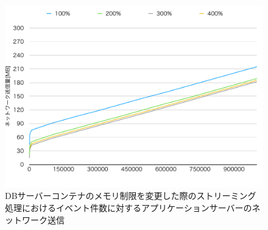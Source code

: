 \documentclass[../../../../../main]{subfiles}
\begin{document}
    \begin{figure}[H]
        \centering
        \includegraphics[width=12cm]{graph}
        \caption{DBサーバーコンテナのメモリ制限を変更した際のストリーミング処理におけるイベント件数に対するアプリケーションサーバーのネットワーク送信}
        \label{fig:stream-change-db-memory-limit-app-net-out-app_4_8192-db_400}
    \end{figure}
\end{document}
